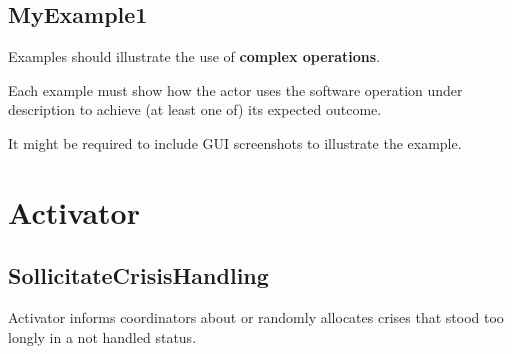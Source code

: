 % 
% 
% 

 
\subsection{MyExample1}
Examples should illustrate the use of \textbf{complex operations}.

Each example must show how the actor uses the software operation under
description to achieve (at least one of) its expected outcome.

It might be required to include GUI screenshots to illustrate the example.

\section{Activator}

\subsection{SollicitateCrisisHandling}
\label{operation:sollicitatecrisishandling}

Activator informs coordinators about or randomly allocates crises that stood too
longly in a not handled status.


